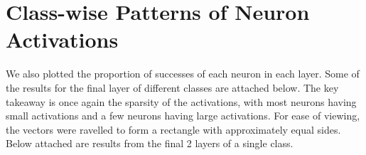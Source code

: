 \documentclass{article}
\begin{document}
    \section{Class-wise Patterns of Neuron Activations}
        We also plotted the proportion of successes of each neuron in each layer. Some of the results for the final layer of different classes are attached below. The key takeaway is once again the sparsity of the activations, with most neurons having small activations and a few neurons having large activations. For ease of viewing, the vectors were ravelled to form a rectangle with approximately equal sides. Below attached are results from the final 2 layers of a single class.
\end{document}
